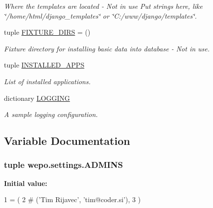 \begin{DoxyCompactItemize}
\begin{DoxyCompactList}\small\item\em Where the templates are located -\/ Not in use Put strings here, like \char`\"{}/home/html/django\-\_\-templates\char`\"{} or \char`\"{}\-C\-:/www/django/templates\char`\"{}. \end{DoxyCompactList}\item 
tuple \hyperlink{namespacewepo_1_1settings_a49bfa96e1114ba66198ffce7c1de2c4a}{F\-I\-X\-T\-U\-R\-E\-\_\-\-D\-I\-R\-S} = ()
\begin{DoxyCompactList}\small\item\em Fixture directory for installing basic data into database -\/ Not in use. \end{DoxyCompactList}\item 
tuple \hyperlink{namespacewepo_1_1settings_afe5c150c28fa0af812216ed9dfc613fe}{I\-N\-S\-T\-A\-L\-L\-E\-D\-\_\-\-A\-P\-P\-S}
\begin{DoxyCompactList}\small\item\em List of installed applications. \end{DoxyCompactList}\item 
dictionary \hyperlink{namespacewepo_1_1settings_a256be23609f64ad17ec9446d46007d8e}{L\-O\-G\-G\-I\-N\-G}
\begin{DoxyCompactList}\small\item\em A sample logging configuration. \end{DoxyCompactList}\end{DoxyCompactItemize}


\subsection{Variable Documentation}
\hypertarget{namespacewepo_1_1settings_a06724aae9ad20b264f7cd38d9382223d}{
\subsubsection[{A\-D\-M\-I\-N\-S}]{\setlength{\rightskip}{0pt plus 5cm}tuple wepo.\-settings.\-A\-D\-M\-I\-N\-S}}\label{namespacewepo_1_1settings_a06724aae9ad20b264f7cd38d9382223d}
{\bfseries Initial value\-:}
\begin{DoxyCode}
1 = (
2    \textcolor{comment}{# ('Tim Rijavec', 'tim@coder.si'),}
3 )
\end{DoxyCode}


